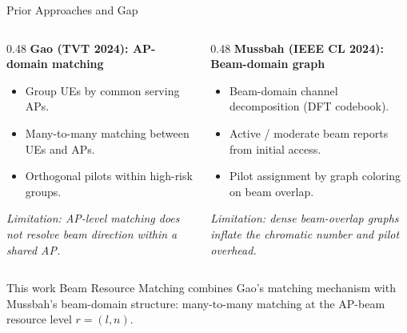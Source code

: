\documentclass[10pt,aspectratio=169]{beamer}
\newcommand{\BRM}{Beam Resource Matching}
\newenvironment{tightitemize}{%
    \begin{itemize}
        \setlength{\itemsep}{2pt}
        \setlength{\parskip}{0pt}
        \setlength{\parsep}{0pt}
}{%
    \end{itemize}
}
\newcommand{\callout}[1]{%
    \vspace{0.3em}
    {\footnotesize\itshape #1}
}
\begin{document}
\begin{frame}{Prior Approaches and Gap}
    \small
    \begin{columns}[T,onlytextwidth]
        \begin{column}{0.48\textwidth}
            \textbf{Gao (TVT 2024): AP-domain matching}
            \begin{tightitemize}
                \item Group UEs by common serving APs.
                \item Many-to-many matching between UEs and APs.
                \item Orthogonal pilots within high-risk groups.
            \end{tightitemize}
            
            \vspace{0.3em}
            \callout{Limitation: AP-level matching does not resolve beam direction within a shared AP.}
        \end{column}
        \begin{column}{0.48\textwidth}
            \textbf{Mussbah (IEEE CL 2024): Beam-domain graph}
            \begin{tightitemize}
                \item Beam-domain channel decomposition (DFT codebook).
                \item Active / moderate beam reports from initial access.
                \item Pilot assignment by graph coloring on beam overlap.
            \end{tightitemize}
            
            \vspace{0.3em}
            \callout{Limitation: dense beam-overlap graphs inflate the chromatic number and pilot overhead.}
        \end{column}
    \end{columns}
    
    \vspace{0.6em}
    \begin{block}{This work}
        \BRM{} combines Gao's matching mechanism with Mussbah's beam-domain structure: many-to-many matching at the AP-beam resource level \(r=(l,n)\).
    \end{block}
\end{frame}

\end{document}
